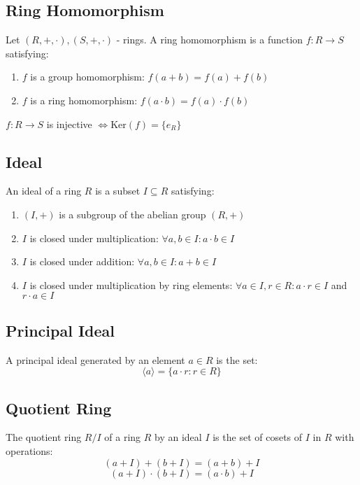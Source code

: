 \documentclass{article}
\begin{document}
\subsection{Ring Homomorphism}

Let \((R,+,\cdot), (S,+,\cdot) \) - rings. A ring homomorphism is a function \( f: R \to S \) satisfying:
\begin{enumerate}
    \item \( f \) is a group homomorphism: \( f(a + b) = f(a) + f(b) \)
    \item \( f \) is a ring homomorphism: \( f(a \cdot b) = f(a) \cdot f(b) \)
\end{enumerate}
$f: R\to S$ is injective \(\iff \text{Ker}(f) = \{e_R\}\)

\subsection{Ideal}

An ideal of a ring \( R \) is a subset \( I \subseteq R \) satisfying:
\begin{enumerate}
    \item \( (I, +) \) is a subgroup of the abelian group \( (R, +) \)
    \item \( I \) is closed under multiplication: \( \forall a, b \in I: a \cdot b \in I \)
    \item \( I \) is closed under addition: \( \forall a, b \in I: a + b \in I \)
    \item \( I \) is closed under multiplication by ring elements: \( \forall a \in I, r \in R: a \cdot r \in I \) and \( r \cdot a \in I \)
\end{enumerate}

\subsection{Principal Ideal}

A principal ideal generated by an element \( a \in R \) is the set:
\[ \langle a \rangle = \{ a \cdot r : r \in R \} \]

\subsection{Quotient Ring}

The quotient ring \( R/I \) of a ring \( R \) by an ideal \( I \) is the set of cosets of \( I \) in \( R \) with operations:
\[ (a + I) + (b + I) = (a + b) + I \]
\[ (a + I) \cdot (b + I) = (a \cdot b) + I \]
\end{document}
